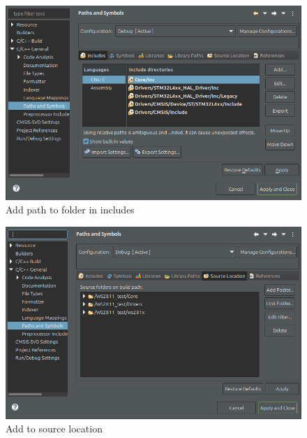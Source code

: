 \documentclass[]{article}
\begin{document}
	\begin{minipage}{0.5\textwidth}
		\begin{figure}[H]
			\centering
			\includegraphics[width=0.9\linewidth]{Properties1}
			\caption{Add path to folder in includes}
			\label{fig:properties1}
		\end{figure}			
	\end{minipage}
	\begin{minipage}{0.5\textwidth}
		\begin{figure}[H]
			\centering
			\includegraphics[width=0.9\linewidth]{Properties2}
			\caption{Add to source location}
			\label{fig:properties2}
		\end{figure}		
	\end{minipage}
\end{document}
